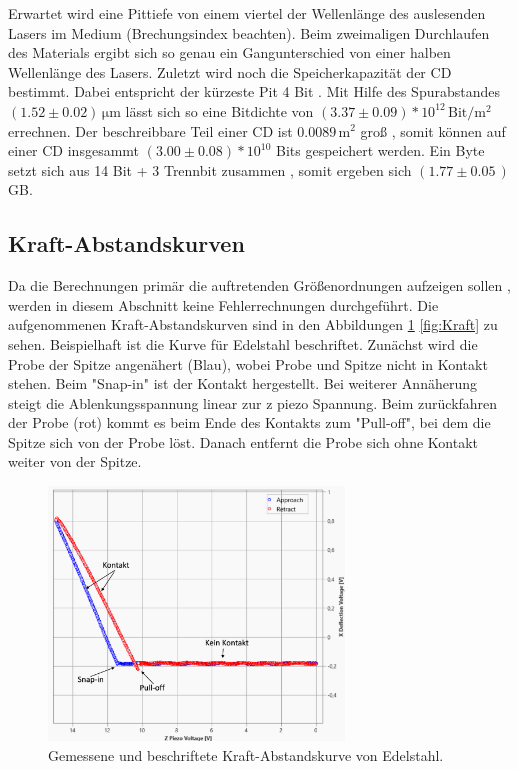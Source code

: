 Erwartet wird eine Pittiefe von einem viertel der Wellenlänge des auslesenden Lasers im Medium (Brechungsindex beachten).
Beim zweimaligen Durchlaufen des Materials ergibt sich so genau ein Gangunterschied von einer halben Wellenlänge des Lasers.
Zuletzt wird noch die Speicherkapazität der CD bestimmt. Dabei entspricht der kürzeste Pit 4 Bit \cite{anleitung}. Mit Hilfe des Spurabstandes 
$(1.52\pm0.02)\,\si{\micro\meter}$ lässt sich so eine Bitdichte von $(3.37\pm0.09)*10^{12}\,\text{Bit}/\si{\meter\squared}$ errechnen. Der beschreibbare Teil einer CD ist $0.0089\,\si{\meter\squared}$ groß \cite{CD_Größe}, somit können auf einer CD
insgesammt $(3.00\pm0.08)*10^{10}$ Bits gespeichert werden. Ein Byte setzt sich aus 
14 Bit + 3 Trennbit zusammen \cite{anleitung}, somit ergeben sich $(1.77\pm0.05\,)$GB.


\subsection{Kraft-Abstandskurven}

Da die Berechnungen primär die auftretenden Größenordnungen aufzeigen sollen \cite{anleitung},
werden in diesem Abschnitt keine Fehlerrechnungen durchgeführt.
Die aufgenommenen Kraft-Abstandskurven sind in den Abbildungen \ref{fig:Edel} \ref{fig:Kraft} zu sehen.
Beispielhaft ist die Kurve für Edelstahl beschriftet. Zunächst wird die Probe der Spitze angenähert (Blau), wobei 
Probe und Spitze nicht in Kontakt stehen. Beim "Snap-in" ist der Kontakt hergestellt.
Bei weiterer Annäherung steigt die Ablenkungsspannung linear zur z piezo Spannung.
Beim zurückfahren der Probe (rot) kommt es beim Ende des Kontakts zum "Pull-off", bei dem 
die Spitze sich von der Probe löst. Danach entfernt die Probe sich ohne Kontakt weiter von der Spitze.
\begin{figure}[H]
    \centering
    \includegraphics[width=0.7\textwidth]{bilder/Kraft_Abstand/Beschriftet_Edelstahl.png}
    \caption{Gemessene und beschriftete Kraft-Abstandskurve von Edelstahl.}
    \label{fig:Edel}
\end{figure}

